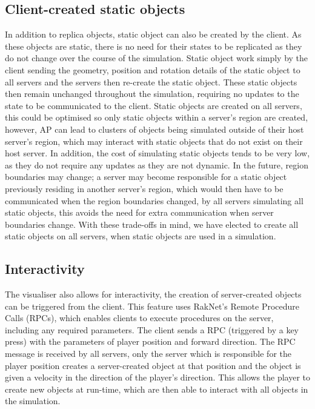 \subsection{Client-created static objects}\label{Client-CreatedReplicas}
In addition to replica objects, static object can also be created by the client. As these objects are static, there is no need for their states to be replicated as they do not change over the course of the simulation. Static object work simply by the client sending the geometry, position and rotation details of the static object to all servers and the servers then re-create the static object. These static objects then remain unchanged throughout the simulation, requiring no updates to the state to be communicated to the client. Static objects are created on all servers, this could be optimised so only static objects within a server's region are created, however, AP can lead to clusters of objects being simulated outside of their host server's region, which may interact with static objects that do not exist on their host server. In addition, the cost of simulating static objects tends to be very low, as they do not require any updates as they are not dynamic. In the future, region boundaries may change; a server may become responsible for a static object previously residing in another server's region, which would then have to be communicated when the region boundaries changed, by all servers simulating all static objects, this avoids the need for extra communication when server boundaries change. With these trade-offs in mind, we have elected to create all static objects on all servers, when static objects are used in a simulation.

\subsection{Interactivity}\label{Interactivity}
The visualiser also allows for interactivity, the creation of server-created objects can be triggered from the client. This feature uses RakNet's Remote Procedure Calls (RPCs), which enables clients to execute procedures on the server, including any required parameters. The client sends a RPC (triggered by a key press) with the parameters of player position and forward direction. The RPC message is received by all servers, only the server which is responsible for the player position creates a server-created object at that position and the object is given a velocity in the direction of the player's direction. This allows the player to create new objects at run-time, which are then able to interact with all objects in the simulation.

